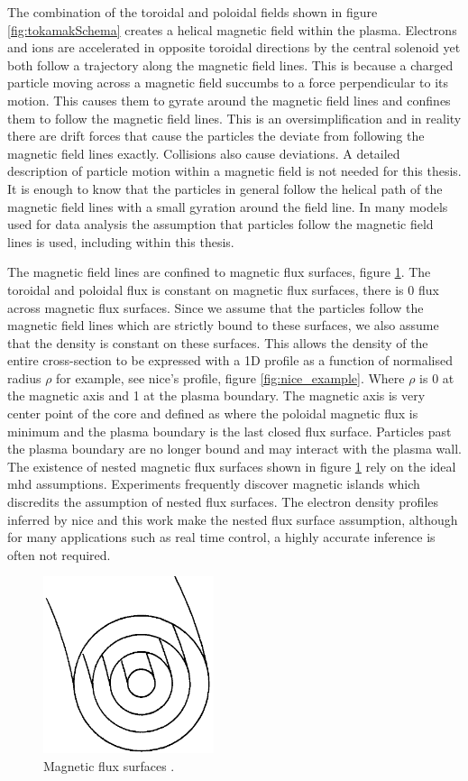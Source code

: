 The combination of the toroidal and poloidal fields shown in figure \ref{fig:tokamakSchema} creates a helical magnetic field within the plasma. Electrons and ions are accelerated in opposite toroidal directions by the central solenoid yet both follow a trajectory along the magnetic field lines. This is because a charged particle moving across a magnetic field succumbs to a force perpendicular to its motion. This causes them to gyrate around the magnetic field lines and confines them to follow the magnetic field lines. This is an oversimplification and in reality there are drift forces that cause the particles the deviate from following the magnetic field lines exactly. Collisions also cause deviations. A detailed description of particle motion within a magnetic field is not needed for this thesis. It is enough to know that the particles in general follow the helical path of the magnetic field lines with a small gyration around the field line. In many models used for data analysis the assumption that particles follow the magnetic field lines is used, including within this thesis. 

The magnetic field lines are confined to magnetic flux surfaces, figure \ref{fig:magfluxsurf}. The toroidal and poloidal flux is constant on magnetic flux surfaces, there is 0 flux across magnetic flux surfaces. Since we assume that the particles follow the magnetic field lines which are strictly bound to these surfaces, we also assume that the density is constant on these surfaces. This allows the density of the entire cross-section to be expressed with a 1D profile as a function of normalised radius $\rho$ for example, see \gls{nice}'s profile, figure \ref{fig:nice_example}. Where $\rho$ is 0 at the magnetic axis and 1 at the plasma boundary. The magnetic axis is very center point of the core and defined as where the poloidal magnetic flux is minimum and the plasma boundary is the last closed flux surface. Particles past the plasma boundary are no longer bound and may interact with the plasma wall. The existence of nested magnetic flux surfaces shown in figure \ref{fig:magfluxsurf} rely on the ideal \gls{mhd} assumptions. Experiments frequently discover magnetic islands which discredits the assumption of nested flux surfaces. The electron density profiles inferred by \gls{nice} and this work make the nested flux surface assumption, although for many applications such as real time control, a highly accurate inference is often not required.

\begin{figure}
  \centering
  \includegraphics[width=5cm]{images/fluxsurf.png}
  \caption{Magnetic flux surfaces \cite{wessontokamak}.}
  \label{fig:magfluxsurf}
\end{figure}

